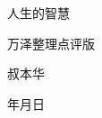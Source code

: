 \documentclass[12pt,oneside]{book}
\begin{document}
\makeatletter
\renewcommand\title[1]{\def\@title{#1}}
\newcommand\subtitle[1]{\def\@subtitle{#1}}
\renewcommand\author[1]{\def\@author{#1}}
\newcommand\version[1]{\def\@version{#1}}
\renewcommand\date[1]{\def\@date{#1}}

\renewcommand{\today}{\number\year{}年\number\month{}月\number\day{}日}
\subtitle{}
\date{\today}
\version{}

\title{人生的智慧}
\author{叔本华}
\subtitle{万泽整理点评版}

\begin{titlepage}
\begin{center}
\vspace*{120pt}
{\fontsize{80pt}{40pt}\selectfont\sffamily \@title}

\vspace{40pt}
{\fontsize{30pt}{20pt}\selectfont\ttfamily \@subtitle} 

\vspace{200pt}
{\fontsize{40pt}{20pt}\selectfont\sffamily \@author}

\vspace{150pt}
{\fontsize{30pt}{20pt}\selectfont\ttfamily \@date \@version}

\end{center}
\end{titlepage}

\makeatother
\end{document}
